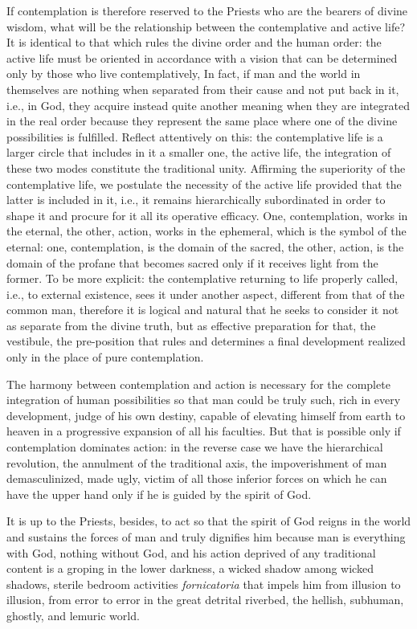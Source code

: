 If contemplation is therefore reserved to the Priests who are the bearers of divine wisdom, what will be the relationship between the contemplative and active life? It is identical to that which rules the divine order and the human order: the active life must be oriented in accordance with a vision that can be determined only by those who live contemplatively, In fact, if man and the world in themselves are nothing when separated from their cause and not put back in it, i.e., in God, they acquire instead quite another meaning when they are integrated in the real order because they represent the same place where one of the divine possibilities is fulfilled. Reflect attentively on this: the contemplative life is a larger circle that includes in it a smaller one, the active life, the integration of these two modes constitute the traditional unity. Affirming the superiority of the contemplative life, we postulate the necessity of the active life provided that the latter is included in it, i.e., it remains hierarchically subordinated in order to shape it and procure for it all its operative efficacy. One, contemplation, works in the eternal, the other, action, works in the ephemeral, which is the symbol of the eternal: one, contemplation, is the domain of the sacred, the other, action, is the domain of the profane that becomes sacred only if it receives light from the former. To be more explicit: the contemplative returning to life properly called, i.e., to external existence, sees it under another aspect, different from that of the common man, therefore it is logical and natural that he seeks to consider it not as separate from the divine truth, but as effective preparation for that, the vestibule, the pre-position that rules and determines a final development realized only in the place of pure contemplation.

The harmony between contemplation and action is necessary for the complete integration of human possibilities so that man could be truly such, rich in every development, judge of his own destiny, capable of elevating himself from earth to heaven in a progressive expansion of all his faculties. But that is possible only if contemplation dominates action: in the reverse case we have the hierarchical revolution, the annulment of the traditional axis, the impoverishment of man demasculinized, made ugly, victim of all those inferior forces on which he can have the upper hand only if he is guided by the spirit of God.

It is up to the Priests, besides, to act so that the spirit of God reigns in the world and sustains the forces of man and truly dignifies him because man is everything with God, nothing without God, and his action deprived of any traditional content is a groping in the lower darkness, a wicked shadow among wicked shadows, sterile bedroom activities \emph{fornicatoria} that impels him from illusion to illusion, from error to error in the great detrital riverbed, the hellish, subhuman, ghostly, and lemuric world.

